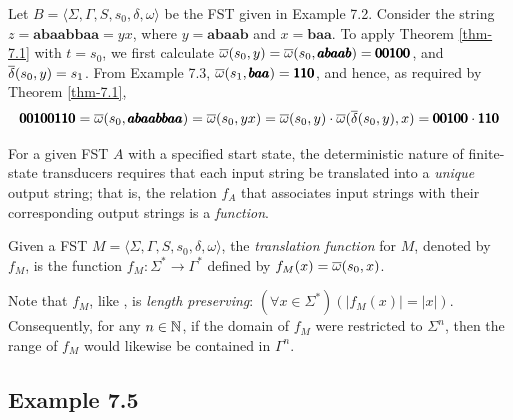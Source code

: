 Let $B=\langle\Sigma,\Gamma,S,s_0,\delta,\omega\rangle$ be the FST given in
Example 7.2. Consider the string $z=\pmb{abaabbaa}=yx$, where $y=\pmb{abaab}$
and $x=\pmb{baa}$. To apply Theorem \ref{thm-7.1} with $t=s_0$, we first calculate
$\overline{\omega}(s_0,y) = \overline{\omega}(s_0,\pmb{abaab}) = \pmb{00100}$, and $\overline{\delta}(s_0,y) = s_1$.
From Example 7.3, $\overline{\omega}(s_1,\pmb{baa}) = \pmb{110}$, and hence, as required by
Theorem \ref{thm-7.1},
\[ \pmb{00100110} = \overline{\omega}(s_0,\pmb{abaabbaa}) = \overline{\omega}(s_0,yx) = \overline{\omega}(s_0,y)
	\cdot \overline{\omega}(\overline{\delta}(s_0,y),x) = \pmb{00100} \cdot \pmb{110} \]

For a given FST $A$ with a specified start state, the deterministic nature of
finite-state transducers requires that each input string be translated into a
\emph{unique} output string; that is, the relation $f_A$ that associates input
strings with their corresponding output strings is a \emph{function}.

\begin{dfn}\label{dfn-7.3}{}
Given a FST $M=\langle\Sigma,\Gamma,S,s_0,\delta,\omega\rangle$, the
\emph{translation function} for $M$, denoted by $f_M$, is the function
$f_M$$: \Sigma^* \rightarrow \Gamma^*$ defined by $f_M(x) = \overline{\omega}(s_0,x)$.
\end{dfn}

Note that $f_M$, like \OBAR, is \emph{length preserving}:
$(\forall x \in \Sigma^*)(|f_M(x)| = |x|)$. Consequently, for any $n \in \mathbb{N}$,
if the domain of $f_M$ were restricted to $\Sigma^n$, then the range of $f_M$
would likewise be contained in $\Gamma^n$.

\subsection*{Example 7.5}

